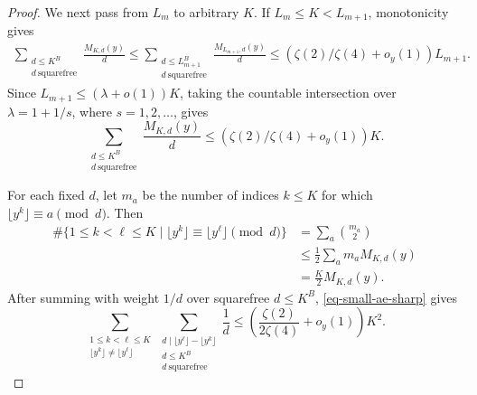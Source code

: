 \documentclass[10pt,a4paper]{amsart}
\begin{document}
\begin{proof}
        We next pass from $L_m$ to arbitrary $K$. If $L_m\le K<L_{m+1}$, monotonicity gives
        $$
        \begin{aligned}
            \sum_{\substack{d\le K^B\\ d\ \mathrm{squarefree}}}\frac{M_{K,d}(y)}d
            \le \sum_{\substack{d\le L_{m+1}^B\\ d\ \mathrm{squarefree}}}\frac{M_{L_{m+1},d}(y)}d
            \le (\zeta(2)/\zeta(4)+o_y(1))L_{m+1}.
        \end{aligned}
        $$
        Since $L_{m+1}\le(\lambda+o(1))K$, taking the countable intersection over $\lambda=1+1/s$, where $s=1,2,\ldots$, gives
        \begin{equation}\label{eq-small-ae-sharp}
            \sum_{\substack{d\le K^B\\ d\ \mathrm{squarefree}}}\frac{M_{K,d}(y)}d
            \le (\zeta(2)/\zeta(4)+o_y(1))K.
        \end{equation}

        For each fixed $d$, let $m_a$ be the number of indices $k\le K$ for which $\lfloor y^k\rfloor\equiv a\pmod d$. Then
        \begin{align*}
            \#\{1\le k<\ell\le K\mid \lfloor y^k\rfloor\equiv\lfloor y^\ell\rfloor\pmod d\}
            &=\sum_a\binom{m_a}{2}\\
            &\le \frac12\sum_a m_aM_{K,d}(y)\\
            &=\frac K2M_{K,d}(y).
        \end{align*}
        After summing with weight $1/d$ over squarefree $d\le K^B$, \eqref{eq-small-ae-sharp} gives
        \begin{equation}\label{eq-small-pair-sharp}
            \sum_{\substack{1\le k<\ell\le K\\ \lfloor y^k\rfloor\ne\lfloor y^\ell\rfloor}}
            \sum_{\substack{d\mid \lfloor y^\ell\rfloor-\lfloor y^k\rfloor\\d\le K^B\\ d\ \mathrm{squarefree}}}\frac1d
            \le \left(\frac{\zeta(2)}{2\zeta(4)}+o_y(1)\right)K^2.
        \end{equation}


\end{proof}
\end{document}
